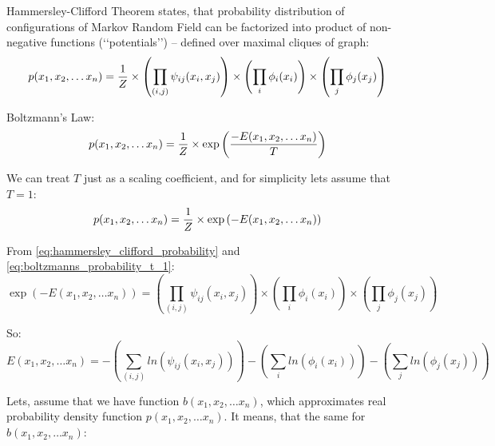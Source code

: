 \documentclass[fleqn,leqno]{article}
\begin{document}
Hammersley-Clifford Theorem \cite{hammersley_clifford_original, hammersley_clifford_proof, wikipedia_hammersley_clifford} states, that probability distribution of configurations of Markov Random Field can be factorized into product of non-negative functions (\lq \lq potentials\rq \rq) -- defined over maximal cliques of graph:
\begin{equation} \label{eq:hammersley_clifford_probability}
p(x_1, x_2, \dots x_n) = {1 \over Z} \times \left( \prod_{(i, j)} \psi_{ij}(x_i, x_j) \right) \times \left( \prod_{i} \phi_i(x_i) \right) \times \left( \prod_{j} \phi_j(x_j) \right)
\end{equation}

Boltzmann's Law:
\begin{equation*}
p(x_1, x_2, \dots x_n) = {1 \over Z} \times \exp \left( {-E(x_1, x_2, \dots x_n) \over T} \right)
\end{equation*}

We can treat $T$ just as a scaling coefficient, and for simplicity lets assume that $T = 1$:
\begin{equation} \label{eq:boltzmanns_probability_t_1}
p(x_1, x_2, \dots x_n) = {1 \over Z} \times \exp \left(-E(x_1, x_2, \dots x_n) \right)
\end{equation}

From \eqref{eq:hammersley_clifford_probability} and \eqref{eq:boltzmanns_probability_t_1}:
\begin{equation*}
\exp \left(-E(x_1, x_2, \dots x_n) \right) = \left( \prod_{(i, j)} \psi_{ij}(x_i, x_j) \right) \times \left( \prod_{i} \phi_i(x_i) \right) \times \left( \prod_{j} \phi_j(x_j) \right)
\end{equation*}

So:
\begin{equation} \label{eq:energy_expression}
E(x_1, x_2, \dots x_n) = - \left( \sum_{(i, j)} ln(\psi_{ij}(x_i, x_j)) \right) - \left( \sum_{i} ln(\phi_i(x_i)) \right) - \left( \sum_{j} ln(\phi_j(x_j)) \right)
\end{equation}

Lets, assume that we have function $b(x_1, x_2, \dots x_n)$, which approximates real probability density function $p(x_1, x_2, \dots x_n)$.
It means, that  the same for $b(x_1, x_2, \dots x_n)$:
\end{document}
